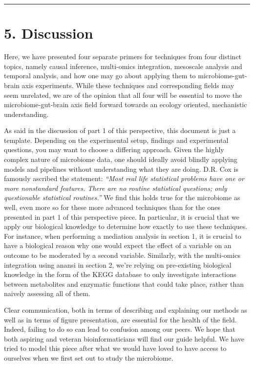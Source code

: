 \documentclass[
]{article}
\begin{document}
\begin{center}\rule{0.5\linewidth}{0.5pt}\end{center}

\newpage

\hypertarget{discussion}{%
\section{5. Discussion}\label{discussion}}

Here, we have presented four separate primers for techniques from four
distinct topics, namely causal inference, multi-omics integration,
mesoscale analysis and temporal analysis, and how one may go about
applying them to microbiome-gut-brain axis experiments. While these
techniques and corresponding fields may seem unrelated, we are of the
opinion that all four will be essential to move the microbiome-gut-brain
axis field forward towards an ecology oriented, mechanistic
understanding.

As said in the discussion of part 1 of this perspective, this document
is just a template. Depending on the experimental setup, findings and
experimental questions, you may want to choose a differing approach.
Given the highly complex nature of microbiome data, one should ideally
avoid blindly applying models and pipelines without understanding what
they are doing. D.R. Cox is famously ascribed the statement:
\emph{``Most real life statistical problems have one or more nonstandard
features. There are no routine statistical questions; only questionable
statistical routines.''} We find this holds true for the microbiome as
well, even more so for these more advanced techniques than for the ones
presented in part 1 of this perspective piece. In particular, it is
crucial that we apply our biological knowledge to determine how exactly
to use these techniques. For instance, when performing a mediation
analysis in section 1, it is crucial to have a biological reason why one
would expect the effect of a variable on an outcome to be moderated by a
second variable. Similarly, with the multi-omics integration using
anansi in section 2, we're relying on pre-existing biological knowledge
in the form of the KEGG database to only investigate interactions
between metabolites and enzymatic functions that could take place,
rather than naively assessing all of them.

Clear communication, both in terms of describing and explaining our
methods as well as in terms of figure presentation, are essential for
the health of the field. Indeed, failing to do so can lead to confusion
among our peers. We hope that both aspiring and veteran
bioinformaticians will find our guide helpful. We have tried to model
this piece after what we would have loved to have access to ourselves
when we first set out to study the microbiome.
\end{document}
